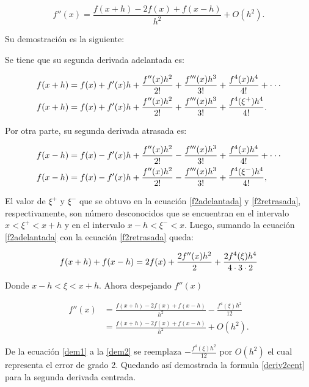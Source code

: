 \documentclass[../portafolio.tex]{subfiles}
\begin{document}
\begin{equation}
    f''(x)=\frac{f(x+h)-2f(x)+f(x-h)}{h^2} + O(h^2). \label{deriv2cent}
\end{equation}

Su demostración es la siguiente:

\vspace{5mm}
Se tiene que su segunda derivada adelantada es:

\begin{align}
    f(x+h) &= f(x) + f'(x)h+ \frac{f''(x) h^2}{2!} +\frac{f'''(x)h^3}{3!} + \frac{f^4(x)h^4}{4!} + \cdot \cdot \cdot \notag \\
    f(x+h) &= f(x) + f'(x)h+ \frac{f''(x) h^2}{2!} +\frac{f'''(x)h^3}{3!} + \frac{f^4(\xi^{+})h^4}{4!}
     \label{f2adelantada}.
\end{align}

Por otra parte, su segunda derivada atrasada es:

\begin{align}
    f(x-h) &= f(x) - f'(x)h +\frac{ f''(x)h^2}{2!} - \frac{f'''(x)h^3}{3!} + \frac{f^4(x)h^4}{4!} + \cdot \cdot \cdot \notag \\
    f(x-h) &= f(x) - f'(x)h +\frac{ f''(x)h^2}{2!} - \frac{f'''(x)h^3}{3!} + \frac{f^4(\xi^{-})h^4}{4!},
    \label{f2retrasada} 
\end{align}


El valor de $\xi^+$ y $\xi^-$ que se obtuvo en la ecuación \ref{f2adelantada} y \ref{f2retrasada}, respectivamente, son número desconocidos que se encuentran en el intervalo $x<\xi^+<x+h$ y en el intervalo $x-h<\xi^-<x$.
Luego, sumando la ecuación \ref{f2adelantada} con la ecuación \ref{f2retrasada} queda:

\begin{equation}
    f(x+h) + f(x-h) = 2f(x) + \frac{2f''(x)h^2}{2} + \frac{2f^4(\xi)h^4}{4\cdot3\cdot2}  \notag
\end{equation}

Donde $x-h<\xi<x+h$. Ahora despejando $f''(x)$

\begin{align}
    f''(x) &=\frac{f(x+h) - 2f(x) + f(x-h)}{h^2} - \frac{f^4(\xi)h^2}{12}  \label{dem1} \\
        &=\frac{f(x+h) - 2f(x) + f(x-h)}{h^2} + O(h^2). \label{dem2}
\end{align}

De la ecuación \ref{dem1} a la \ref{dem2} se reemplaza $-\frac{f^4(\xi)h^2 }{12}$ por $O(h^2)$ el cual representa el error de grado 2.
Quedando así demostrada la formula \ref{deriv2cent} para la segunda derivada centrada.
\end{document}
